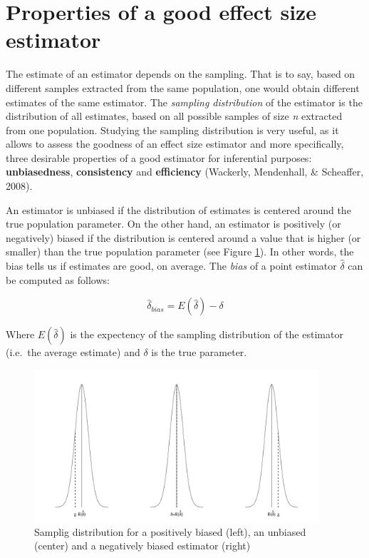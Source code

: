 \documentclass[
  man,floatsintext]{apa6}
\begin{document}
\hypertarget{properties-of-a-good-effect-size-estimator}{%
\section{Properties of a good effect size estimator}\label{properties-of-a-good-effect-size-estimator}}

The estimate of an estimator depends on the sampling. That is to say, based on different samples extracted from the same population, one would obtain different estimates of the same estimator. The \emph{sampling distribution} of the estimator is the distribution of all estimates, based on all possible samples of size \emph{n} extracted from one population. Studying the sampling distribution is very useful, as it allows to assess the goodness of an effect size estimator and more specifically, three desirable properties of a good estimator for inferential purposes: \textbf{unbiasedness}, \textbf{consistency} and \textbf{efficiency} (Wackerly, Mendenhall, \& Scheaffer, 2008).

An estimator is unbiased if the distribution of estimates is centered around the true population parameter. On the other hand, an estimator is positively (or negatively) biased if the distribution is centered around a value that is higher (or smaller) than the true population parameter (see Figure \ref{fig:BIAS}). In other words, the bias tells us if estimates are good, on average. The \emph{bias} of a point estimator \(\hat{\delta}\) can be computed as follows:

\begin{equation} 
\hat{\delta}_{bias}=E(\hat{\delta})-\delta
\label{eq:BIAS}
\end{equation}

Where \(E(\hat{\delta})\) is the expectency of the sampling distribution of the estimator (i.e.~the average estimate) and \(\delta\) is the true parameter.

\begin{figure}
\includegraphics[width=400px]{ES_files/figure-latex/BIAS-1} \caption{Samplig distribution for a positively biased (left), an unbiased (center) and a negatively biased estimator (right)}\label{fig:BIAS}
\end{figure}
\end{document}
